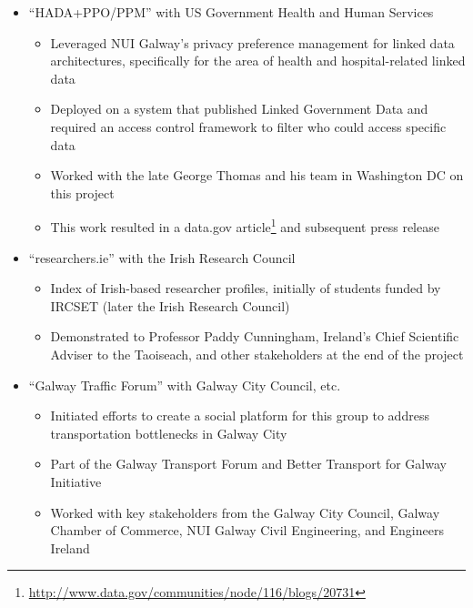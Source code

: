 \documentclass[10pt,a4paper]{res} %
\begin{document}
\begin{resume}
\begin{itemize} \itemsep -2pt
\item ``HADA+PPO/PPM'' with US Government Health and Human Services
\begin{itemize} \itemsep -2pt
\item Leveraged NUI Galway's privacy preference management for linked data architectures, specifically for the area of health and hospital-related linked data
\item Deployed on a system that published Linked Government Data and required an access control framework to filter who could access specific data
\item Worked with the late George Thomas and his team in Washington DC on this project
\item This work resulted in a data.gov article\footnote{\url{http://www.data.gov/communities/node/116/blogs/20731}} and subsequent press release
\end{itemize}
\item ``researchers.ie'' with the Irish Research Council
\begin{itemize} \itemsep -2pt
\item Index of Irish-based researcher profiles, initially of students funded by IRCSET (later the Irish Research Council)
\item Demonstrated to Professor Paddy Cunningham, Ireland's Chief Scientific Adviser to the Taoiseach, and other stakeholders at the end of the project
\end{itemize}
\item ``Galway Traffic Forum'' with Galway City Council, etc.
\begin{itemize} \itemsep -2pt
\item Initiated efforts to create a social platform for this group to address transportation bottlenecks in Galway City
\item Part of the Galway Transport Forum and Better Transport for Galway Initiative
\item Worked with key stakeholders from the Galway City Council, Galway Chamber of Commerce, NUI Galway Civil Engineering, and Engineers Ireland
\end{itemize}
\end{itemize}


\vspace{0.2in} %


\end{resume}
\end{document}
